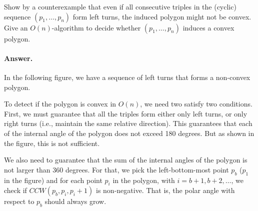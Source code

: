 \documentclass[a4paper]{article}
\begin{document}
Show by a counterexample that even if all consecutive triples in the (cyclic) sequence $(p_1, \ldots, p_n)$ form left turns, the induced polygon might not be convex. Give an $O(n)$-algorithm to decide whether $(p_1, \ldots, p_n)$ induces a convex polygon.

\paragraph{Answer.}

In the following figure, we have a sequence of left turns that forms a non-convex polygon.

\begin{figure}[h]
\centering
{}
\end{figure}

To detect if the polygon is convex in $O(n)$, we need two satisfy two conditions. First, we must guarantee that all the triples form either only left turns, or only right turns (i.e., maintain the same relative direction). This guarantees that each of the internal angle of the polygon does not exceed 180 degrees. But as shown in the figure, this is not sufficient.

We also need to guarantee that the sum of the internal angles of the polygon is not larger than 360 degrees. For that, we pick the left-bottom-most point $p_b$ ($p_1$ in the figure) and for each point $p_i$ in the polygon, with $i = b+1, b+2, \ldots$, we check if ${CCW}(p_b, p_i, p_i+1)$ is non-negative. That is, the polar angle with respect to $p_b$ should always grow.
\end{document}
